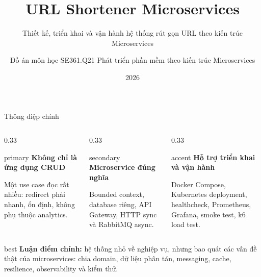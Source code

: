 \documentclass[aspectratio=169]{beamer}
\title[URL Shortener Microservices]{\textbf{URL Shortener Microservices}}
\subtitle{Thiết kế, triển khai và vận hành hệ thống rút gọn URL theo kiến trúc Microservices}
\author{Đồ án môn học SE361.Q21 \textemdash{} Phát triển phần mềm theo kiến trúc Microservices}
\institute{University of Information Technology \textemdash{} VNU-HCM}
\date{2026}
\begin{document}
\begin{frame}
    \titlepage
\end{frame}

\begin{frame}{Thông điệp chính}
    \begin{columns}[T,onlytextwidth]
        \begin{column}{0.33\textwidth}
            \begin{claimbox}{primary}
                \centering\large\textbf{Không chỉ là ứng dụng CRUD}\par
                \vspace{0.15cm}
                \small Một use case đọc rất nhiều: redirect phải nhanh, ổn định, không phụ thuộc analytics.
            \end{claimbox}
        \end{column}
        \begin{column}{0.33\textwidth}
            \begin{claimbox}{secondary}
                \centering\large\textbf{Microservice đúng nghĩa}\par
                \vspace{0.15cm}
                \small Bounded context, database riêng, API Gateway, HTTP sync và RabbitMQ async.
            \end{claimbox}
        \end{column}
        \begin{column}{0.33\textwidth}
            \begin{claimbox}{accent}
                \centering\large\textbf{Hỗ trợ triển khai và vận hành}\par
                \vspace{0.15cm}
                \small Docker Compose, Kubernetes deployment, healthcheck, Prometheus, Grafana, smoke test, k6 load test.
            \end{claimbox}
        \end{column}
    \end{columns}

    \vspace{0.55cm}
    \begin{center}
        \begin{claimbox}[width=0.86\textwidth, halign=center]{best}
            \textbf{Luận điểm chính:} hệ thống nhỏ về nghiệp vụ, nhưng bao quát các vấn đề thật của microservices: chia domain, dữ liệu phân tán, messaging, cache, resilience, observability và kiểm thử.
        \end{claimbox}
    \end{center}
\end{frame}
\end{document}
